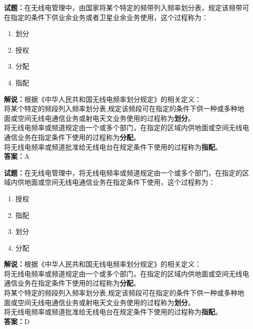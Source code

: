 \documentclass{ctexbook}
\begin{document}
\bigskip


\noindent\textbf{试题：}在无线电管理中，由国家将某个特定的频带列入频率划分表，规定该频带可在指定的条件下供业余业务或者卫星业余业务使用，这个过程称为：
\begin{enumerate}[leftmargin=3em]
	\item 划分
	\item 授权
	\item 分配
	\item 指配
\end{enumerate}
\noindent\textbf{解说：}根据《中华人民共和国无线电频率划分规定》的相关定义：\\将某个特定的频段列入频率划分表,规定该频段可在指定的条件下供一种或多种地面或空间无线电通信业务或射电天文业务使用的过程称为\textbf{划分}。\\将无线电频率或频道规定由一个或多个部门，在指定的区域内供地面或空间无线电通信业务在指定条件下使用的过程称为\textbf{分配}。\\将无线电频率或频道批准给无线电台在规定条件下使用的过程称为\textbf{指配}。\\
\textbf{答案：}A



\bigskip


\noindent\textbf{试题：}在无线电管理中，将无线电频率或频道规定由一个或多个部门，在指定的区域内供地面或空间无线电通信业务在指定条件下使用，这个过程称为：
\begin{enumerate}[leftmargin=3em]
	\item 授权
	\item 指配
	\item 划分
	\item 分配
\end{enumerate}
\noindent\textbf{解说：}根据《中华人民共和国无线电频率划分规定》的相关定义：\\将无线电频率或频道规定由一个或多个部门，在指定的区域内供地面或空间无线电通信业务在指定条件下使用的过程称为\textbf{分配}。\\将某个特定的频段列入频率划分表,规定该频段可在指定的条件下供一种或多种地面或空间无线电通信业务或射电天文业务使用的过程称为\textbf{划分}。\\将无线电频率或频道批准给无线电台在规定条件下使用的过程称为\textbf{指配}。\\
\textbf{答案：}D



\bigskip
\end{document}
